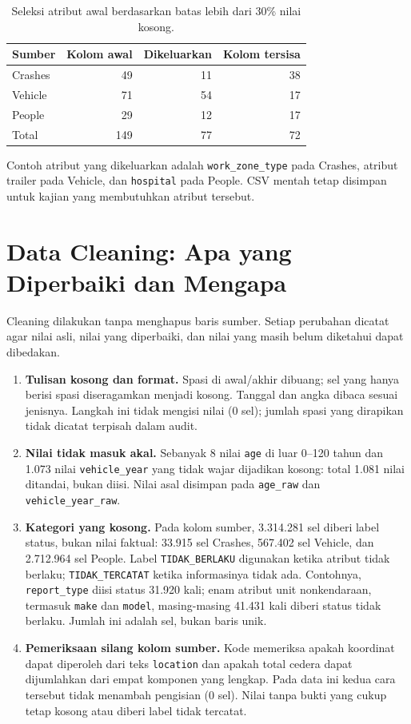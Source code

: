 \documentclass[10pt,a4paper]{article}
\begin{document}
\begin{table}[H]
\centering\small
\caption{Seleksi atribut awal berdasarkan batas lebih dari 30\% nilai kosong.}
\begin{tabular}{lrrr}
\toprule
Sumber & Kolom awal & Dikeluarkan & Kolom tersisa\\
\midrule
Crashes & 49 & 11 & 38\\
Vehicle & 71 & 54 & 17\\
People & 29 & 12 & 17\\
\midrule
Total & 149 & 77 & 72\\
\bottomrule
\end{tabular}
\end{table}

Contoh atribut yang dikeluarkan adalah \texttt{work\_zone\_type} pada
Crashes, atribut trailer pada Vehicle, dan \texttt{hospital} pada People.
CSV mentah tetap disimpan untuk kajian yang membutuhkan atribut tersebut.

\section{Data Cleaning: Apa yang Diperbaiki dan Mengapa}

Cleaning dilakukan tanpa menghapus baris sumber. Setiap perubahan dicatat
agar nilai asli, nilai yang diperbaiki, dan nilai yang masih belum diketahui
dapat dibedakan.

\begin{enumerate}
\item \textbf{Tulisan kosong dan format.} Spasi di awal/akhir dibuang; sel yang
hanya berisi spasi diseragamkan menjadi kosong. Tanggal dan angka dibaca
sesuai jenisnya. Langkah ini tidak mengisi nilai (0 sel); jumlah spasi yang
dirapikan tidak dicatat terpisah dalam audit.
\item \textbf{Nilai tidak masuk akal.} Sebanyak 8 nilai \texttt{age} di luar
0--120 tahun dan 1.073 nilai \texttt{vehicle\_year} yang tidak wajar
dijadikan kosong: total 1.081 nilai ditandai, bukan diisi. Nilai asal
disimpan pada \texttt{age\_raw} dan \texttt{vehicle\_year\_raw}.
\item \textbf{Kategori yang kosong.} Pada kolom sumber, 3.314.281 sel diberi
label status, bukan nilai faktual: 33.915 sel Crashes, 567.402 sel Vehicle,
dan 2.712.964 sel People. Label \texttt{TIDAK\_BERLAKU} digunakan ketika
atribut tidak berlaku; \texttt{TIDAK\_TERCATAT} ketika informasinya tidak ada.
Contohnya, \texttt{report\_type} diisi status 31.920 kali; enam atribut
unit nonkendaraan, termasuk \texttt{make} dan \texttt{model}, masing-masing
41.431 kali diberi status tidak berlaku. Jumlah ini adalah sel, bukan baris unik.
\item \textbf{Pemeriksaan silang kolom sumber.} Kode memeriksa apakah
koordinat dapat diperoleh dari teks \texttt{location} dan apakah total
cedera dapat dijumlahkan dari empat komponen yang lengkap. Pada data ini
kedua cara tersebut tidak menambah pengisian (0 sel). Nilai tanpa bukti
yang cukup tetap kosong atau diberi label tidak tercatat.
\end{enumerate}
\end{document}

